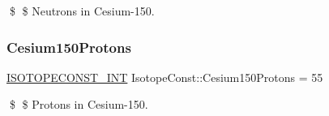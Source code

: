 \$ \$ Neutrons in Cesium-\/150. \mbox{\label{group___isotope_const-_cesium-_cs150_ga64c9fa68eb913e4f91f2f742cfadf17c}} 
\subsubsection{\texorpdfstring{Cesium150\+Protons}{Cesium150Protons}}
{\footnotesize\ttfamily \mbox{\hyperlink{group___isotope_const-_macros_ga5f18360b3e99483a35c32d789e62621c}{I\+S\+O\+T\+O\+P\+E\+C\+O\+N\+S\+T\+\_\+\+I\+NT}} Isotope\+Const\+::\+Cesium150\+Protons = 55}

\$ \$ Protons in Cesium-\/150. 
